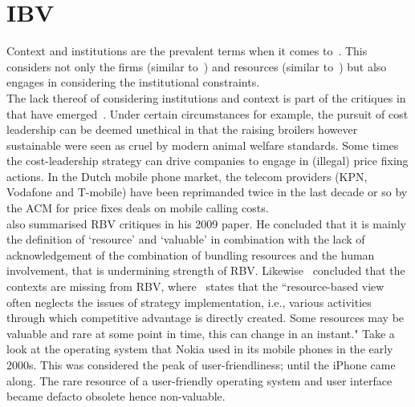 \section{\gls{IBV}}

Context and institutions are the prevalent terms when it comes to~\ibv. %
This \ibv considers not only the firms (similar to~\cite{Porter:1980}) and resources (similar to~\cite{Barney:1991}) but also engages in considering the institutional constraints.\\
The lack thereof of considering institutions and context is part of the critiques in that have emerged~\cite{Narayanan:2005}.
Under certain circumstances for example, the pursuit of cost leadership can be deemed unethical in that the raising broilers however sustainable were seen as cruel by modern animal welfare standards. 
Some times the cost-leadership strategy can drive companies to engage in (illegal) price fixing actions. 
In the Dutch mobile phone market, the telecom providers (KPN, Vodafone and T-mobile) have been reprimanded twice in the last decade or so by the \gls{ACM} for price fixes deals on mobile calling costs. \\
\cite{Kraaijenbrink:2009} also summarised \gls{RBV} critiques in his 2009 paper. 
He concluded that it is mainly the definition of `resource' and `valuable' in combination with the lack of acknowledgement of the combination of bundling resources and the human involvement, that is undermining strength of \gls{RBV}.
Likewise~\cite{Priem:2001} concluded that the contexts are missing from \gls{RBV}, where~\cite{Dung:2012} states that the ``resource-based view often neglects the issues of strategy implementation, i.e., various activities through which competitive advantage is directly created. Some resources may be valuable and rare at some point in time, this can change in an instant." 
Take a look at the operating system that Nokia used in its mobile phones in the early 2000s. 
This was considered the peak of user-friendliness; until the iPhone came along. 
The rare resource of a user-friendly operating system and user interface became defacto obsolete hence non-valuable.\\


